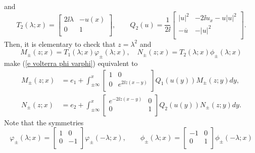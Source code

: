 and
\begin{equation}\label{e def T2 Q2}
    T_2(\lambda;x)=
    \left[
      \begin{array}{cc}
        2\ii\lambda &-u(x) \\
        0 & 1 \\
      \end{array}
    \right],\qquad
    Q_2(u)=\frac{1}{2\ii}
    \left[
      \begin{array}{cc}
        |u|^2 & -2\ii u_x -u|u|^2 \\
        -\overline{u}& -|u|^2 \\
      \end{array}
    \right].
\end{equation}
Then, it is elementary to check that $z=\lambda^2$ and
\begin{equation}\label{e def M N}
    M_{\pm}(z;x)=T_1(\lambda;x)\varphi_{\pm} (\lambda;x),\quad
    N_{\pm}(z;x)=T_2(\lambda;x)\phi_{\pm}(\lambda;x)
\end{equation}
make (\ref{e volterra phi varphi}) equivalent to
\begin{equation}\label{e volterra M N}
    \begin{aligned}
        M_{\pm}(z;x)&=e_1 +  \int_{\pm\infty}^x
        \left[
          \begin{array}{cc}
            1 & 0 \\
            0 & e^{2\ii z(x-y)} \\
          \end{array}
        \right]
        Q_1(u(y))M_{\pm}(z;y)dy,\\
        N_{\pm}(z;x)&=e_2 +  \int_{\pm\infty}^x
        \left[
          \begin{array}{cc}
            e^{-2\ii z (x-y)} & 0 \\
            0 & 1\\
          \end{array}
        \right]
        Q_2(u(y))N_{\pm}(z;y)dy.
    \end{aligned}
\end{equation}
Note that the symmetries
\begin{equation}\label{e symmetries phi varphi 1}
    \varphi_{\pm}(\lambda;x)=
    \left[
      \begin{array}{cc}
        1 & 0 \\
        0 & -1 \\
      \end{array}
    \right]
    \varphi_{\pm}(-\lambda;x),\qquad
    \phi_{\pm}(\lambda;x)=
    \left[
      \begin{array}{cc}
        -1 & 0 \\
        0 & 1 \\
      \end{array}
    \right]
    \phi_{\pm}(-\lambda;x)
\end{equation}

